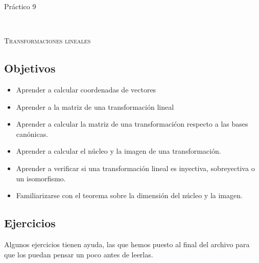 \documentclass[12pt]{amsart}
\begin{document}



\centerline{\Large{Pr\' actico 9}}

\

\centerline{\textsc{Transformaciones lineales}}

\subsection*{Objetivos}

\begin{itemize}
 \item Aprender a calcular coordenadas de vectores
 \item Aprender a la matriz de una transformaci\'on lineal
 \item Aprender a calcular la matriz de una transformaci\'con respecto a las bases can\'onicas.
 \item Aprender a calcular el n\'ucleo y la imagen de una transformaci\'on.
 \item Aprender a verificar si una transformaci\'on lineal es inyectiva, sobreyectiva o un isomorfismo.
 \item Familiarizarse con el teorema sobre la dimensi\'on del n\'ucleo y la imagen.
\end{itemize}


\bigbreak 


\subsection*{Ejercicios}

Algunos ejercicios tienen ayuda, las que hemos puesto al final del archivo para que los puedan pensar un poco antes de leerlas.
\end{document}
